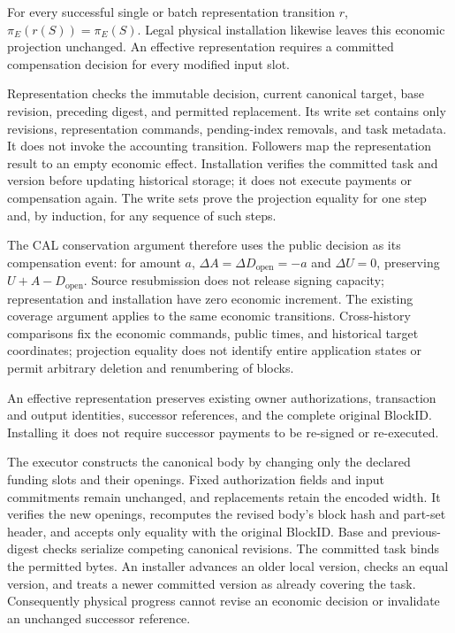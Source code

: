 \begin{lemma}
\label{lem:c3-representation-inert}
For every successful single or batch representation transition $r$,
$\pi_E(r(S))=\pi_E(S)$. Legal physical installation likewise leaves this
economic projection unchanged. An effective representation requires a
committed compensation decision for every modified input slot.
\end{lemma}
\begin{IEEEproof}
Representation checks the immutable decision, current canonical target,
base revision, preceding digest, and permitted replacement. Its write set
contains only revisions, representation commands, pending-index removals,
and task metadata. It does not invoke the accounting transition. Followers
map the representation result to an empty economic effect. Installation
verifies the committed task and version before updating historical storage;
it does not execute payments or compensation again. The write sets prove
the projection equality for one step and, by induction, for any sequence
of such steps.
\end{IEEEproof}

The CAL conservation argument therefore uses the public decision as its
compensation event: for amount $a$, $\Delta A=\Delta D_{\mathrm{open}}=-a$
and $\Delta U=0$, preserving $U+A-D_{\mathrm{open}}$. Source resubmission
does not release signing capacity; representation and installation have
zero economic increment. The existing coverage argument applies to the
same economic transitions. Cross-history comparisons fix the economic
commands, public times, and historical target coordinates; projection
equality does not identify entire application states or permit arbitrary
deletion and renumbering of blocks.

\begin{lemma}
\label{lem:c3-identity}
An effective representation preserves existing owner authorizations,
transaction and output identities, successor references, and the complete
original BlockID. Installing it does not require successor payments to be
re-signed or re-executed.
\end{lemma}
\begin{IEEEproof}
The executor constructs the canonical body by changing only the declared
funding slots and their openings. Fixed authorization fields and input
commitments remain unchanged, and replacements retain the encoded width.
It verifies the new openings, recomputes the revised body's block hash and
part-set header, and accepts only equality with the original BlockID.
Base and previous-digest checks serialize competing canonical revisions.
The committed task binds the permitted bytes. An installer advances an
older local version, checks an equal version, and treats a newer committed
version as already covering the task. Consequently physical progress
cannot revise an economic decision or invalidate an unchanged successor
reference.
\end{IEEEproof}


